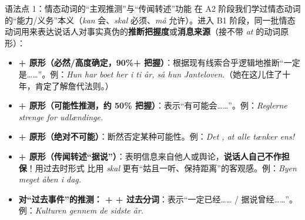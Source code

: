 \begin{grammatikbox}{语法点 1：情态动词的“主观推测”与“传闻转述”功能}
在 A2 阶段我们学过情态动词的“能力/义务”本义（\textit{kan} 会、\textit{skal} 必须、\textit{må} 允许）。进入 B1 阶段，同一批情态动词用来表达说话人对事实真伪的\textbf{推断把握度}或\textbf{消息来源}（接不带 \textit{at} 的动词原形）：
\begin{itemize}
  \item \textbf{ + 原形（必然/高度确定，90\%+ 把握）}：根据现有线索合乎逻辑地推断“一定是……”。例：\textit{Hun har boet her i ti år, så hun  Janteloven.}（她在这儿住了十年，肯定了解詹代法则。）
  \item \textbf{ + 原形（可能性推测，约 50\% 把握）}：表示“有可能会……”。例：\textit{Reglerne  strenge for udlændinge.}
  \item \textbf{ + 原形（绝对不可能）}：断然否定某种可能性。例：\textit{Det , at alle tænker ens!}
  \item \textbf{ + 原形（传闻转述“据说”）}：表明信息来自他人或舆论，\textbf{说话人自己不作担保}！用过去时形式  比用 \textit{skal} 更有“姑且一听、保持距离”的客观感。例：\textit{Byen  meget åben i dag.}
  \item \textbf{对“过去事件”的推测： +  + 过去分词}：表示“一定已经…… / 据说曾经……”。例：\textit{Kulturen  gennem de sidste år.}
\end{itemize}
\end{grammatikbox}

